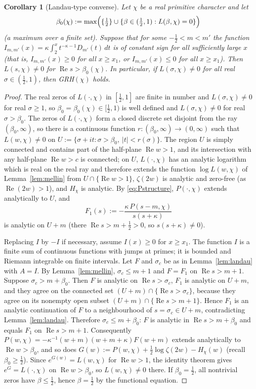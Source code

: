 \documentclass[11pt]{amsart}
\newtheorem{corollary}[theorem]{Corollary}
\theoremstyle{definition}
\numberwithin{equation}{section}
\newcommand{\re}{\operatorname{Re}}
\begin{document}
\begin{corollary}[Landau-type converse]\label{cor:landau}
Let $\chi$ be a real primitive character and let
\[
\beta_0(\chi):=\max\Bigl(\{\tfrac12\}\cup
\{\beta\in(\tfrac12,1):L(\beta,\chi)=0\}\Bigr)
\]
(a maximum over a finite set). Suppose that for some
$-\tfrac12<m<m'$ the function $I_{m,m'}(x)
=\kappa\int_2^xt^{-\kappa-1}D_{m'}(t)\,dt$ is of constant sign for all
sufficiently large $x$ (that is, $I_{m,m'}(x)\ge0$ for all
$x\ge x_1$, or $I_{m,m'}(x)\le0$ for all $x\ge x_1$). Then
$L(s,\chi)\ne0$ for $\re s>\beta_0(\chi)$. In particular, if
$L(\sigma,\chi)\ne0$ for all real $\sigma\in(\tfrac12,1)$, then
GRH$(\chi)$ holds.
\end{corollary}

\begin{proof}
The real zeros of $L(\cdot,\chi)$ in $[\tfrac12,1]$ are finite in
number and $L(\sigma,\chi)\ne0$ for real $\sigma\ge1$, so
$\beta_0=\beta_0(\chi)\in[\tfrac12,1)$ is well defined and
$L(\sigma,\chi)\ne0$ for real $\sigma>\beta_0$. The zeros of
$L(\cdot,\chi)$ form a closed discrete set disjoint from the ray
$(\beta_0,\infty)$, so there is a continuous function
$r:(\beta_0,\infty)\to(0,\infty)$ such that $L(w,\chi)\ne0$ on
$U:=\{\sigma+it:\sigma>\beta_0,\ |t|<r(\sigma)\}$. The region $U$ is
simply connected and contains part of the half-plane $\re w>1$, and
its intersection with any half-plane $\re w>c$ is connected; on $U$,
$L(\cdot,\chi)$ has an analytic logarithm which is real on the real
ray and therefore extends the function $\log L(w,\chi)$ of
Lemma~\ref{lem:mellin} from $U\cap\{\re w>1\}$, $\zeta(2w)$ is analytic and zero-free (as
$\re(2w)>1$), and $H_\chi$ is analytic. By \eqref{eq:Pstructure},
$P(\cdot,\chi)$ extends analytically to $U$, and
\[
F_1(s):=-\frac{\kappa\,P(s-m,\chi)}{s(s+\kappa)}
\]
is analytic on $U+m$ (there $\re s>m+\tfrac12>0$, so $s(s+\kappa)\ne0$).

Replacing $I$ by $-I$ if necessary, assume $I(x)\ge0$ for $x\ge x_1$.
The function $I$ is a finite sum of continuous functions with jumps
at primes; it is bounded and Riemann integrable on finite intervals.
Let $F$ and $\sigma_c$ be as in Lemma~\ref{lem:landau} with $A=I$. By
Lemma~\ref{lem:mellin}, $\sigma_c\le m+1$ and $F=F_1$ on
$\re s>m+1$. Suppose $\sigma_c>m+\beta_0$. Then $F$ is analytic on
$\re s>\sigma_c$, $F_1$ is analytic on $U+m$, and they agree on the
connected set $(U+m)\cap\{\re s>\sigma_c\}$, because they agree on
its nonempty open subset $(U+m)\cap\{\re s>m+1\}$. Hence $F_1$ is an
analytic continuation of $F$ to a neighbourhood of $s=\sigma_c\in
U+m$, contradicting Lemma~\ref{lem:landau}. Therefore
$\sigma_c\le m+\beta_0$: $F$ is analytic in $\re s>m+\beta_0$ and
equals $F_1$ on $\re s>m+1$. Consequently
$P(w,\chi)=-\kappa^{-1}(w+m)(w+m+\kappa)F(w+m)$ extends analytically
to $\re w>\beta_0$, and so does
$G(w):=P(w,\chi)+\tfrac12\log\zeta(2w)-H_\chi(w)$ (recall
$\beta_0\ge\tfrac12$). Since $e^{G(w)}=L(w,\chi)$ for $\re w>1$, the
identity theorem gives $e^{G}=L(\cdot,\chi)$ on $\re w>\beta_0$, so
$L(w,\chi)\ne0$ there. If $\beta_0=\tfrac12$, all nontrivial zeros
have $\beta\le\tfrac12$, hence $\beta=\tfrac12$ by the functional
equation.
\end{proof}
\end{document}

